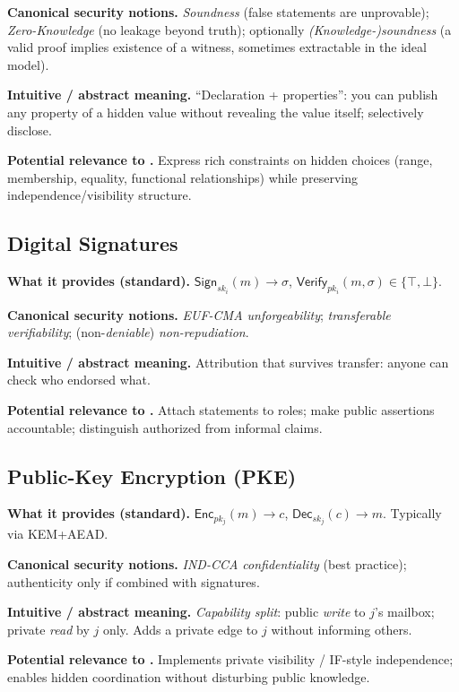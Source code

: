 \textbf{Canonical security notions.}
\emph{Soundness} (false statements are unprovable);
\emph{Zero-Knowledge} (no leakage beyond truth);
optionally \emph{(Knowledge-)soundness} (a valid proof implies existence of a
witness, sometimes extractable in the ideal model).

\textbf{Intuitive / abstract meaning.}
“Declaration + properties”: you can publish any property of a hidden value
without revealing the value itself; selectively disclose.

\textbf{Potential relevance to \KFOL.}
Express rich constraints on hidden choices (range, membership, equality, functional
relationships) while preserving independence/visibility structure.

\subsection{Digital Signatures}
\textbf{What it provides (standard).}
$\mathsf{Sign}_{sk_i}(m)\to\sigma$, $\mathsf{Verify}_{pk_i}(m,\sigma)\in\{\top,\bot\}$.

\textbf{Canonical security notions.}
\emph{EUF-CMA unforgeability}; \emph{transferable verifiability};
(non-\emph{deniable}) \emph{non-repudiation}.

\textbf{Intuitive / abstract meaning.}
Attribution that survives transfer: anyone can check who endorsed what.

\textbf{Potential relevance to \KFOL.}
Attach statements to roles; make public assertions accountable; distinguish
authorized from informal claims.

\subsection{Public-Key Encryption (PKE)}
\textbf{What it provides (standard).}
$\mathsf{Enc}_{pk_j}(m)\to c$, $\mathsf{Dec}_{sk_j}(c)\to m$. Typically via KEM+AEAD.

\textbf{Canonical security notions.}
\emph{IND-CCA confidentiality} (best practice); authenticity only if combined with signatures.

\textbf{Intuitive / abstract meaning.}
\emph{Capability split}: public \emph{write} to $j$’s mailbox; private \emph{read}
by $j$ only. Adds a private edge to $j$ without informing others.

\textbf{Potential relevance to \KFOL.}
Implements private visibility / IF-style independence; enables hidden coordination
without disturbing public knowledge.

